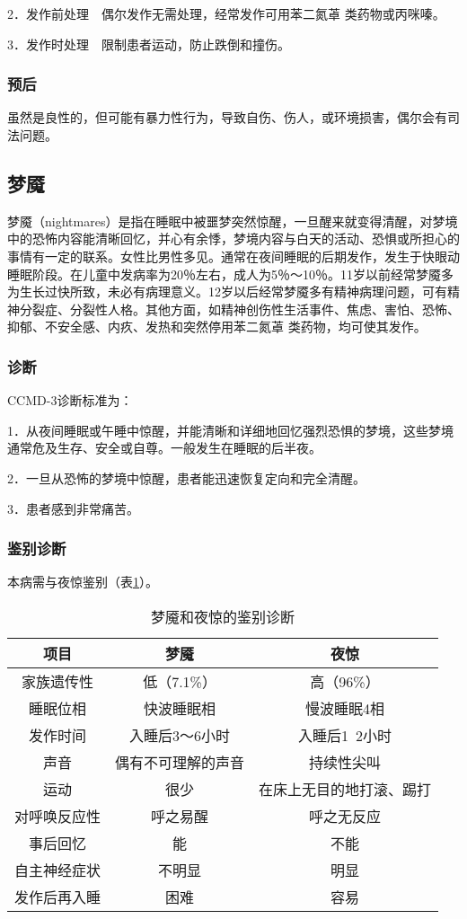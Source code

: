 2．发作前处理　偶尔发作无需处理，经常发作可用苯二氮䓬
类药物或丙咪嗪。

3．发作时处理　限制患者运动，防止跌倒和撞伤。

\subsubsection{预后}

虽然是良性的，但可能有暴力性行为，导致自伤、伤人，或环境损害，偶尔会有司法问题。

\subsection{梦魇}

梦魇（nightmares）是指在睡眠中被噩梦突然惊醒，一旦醒来就变得清醒，对梦境中的恐怖内容能清晰回忆，并心有余悸，梦境内容与白天的活动、恐惧或所担心的事情有一定的联系。女性比男性多见。通常在夜间睡眠的后期发作，发生于快眼动睡眠阶段。在儿童中发病率为20％左右，成人为5％～10％。11岁以前经常梦魇多为生长过快所致，未必有病理意义。12岁以后经常梦魇多有精神病理问题，可有精神分裂症、分裂性人格。其他方面，如精神创伤性生活事件、焦虑、害怕、恐怖、抑郁、不安全感、内疚、发热和突然停用苯二氮䓬
类药物，均可使其发作。

\subsubsection{诊断}

CCMD-3诊断标准为：

1．从夜间睡眠或午睡中惊醒，并能清晰和详细地回忆强烈恐惧的梦境，这些梦境通常危及生存、安全或自尊。一般发生在睡眠的后半夜。

2．一旦从恐怖的梦境中惊醒，患者能迅速恢复定向和完全清醒。

3．患者感到非常痛苦。

\subsubsection{鉴别诊断}

本病需与夜惊鉴别（表\ref{tab13-1}）。

\begin{table}
\centering
\caption{梦魇和夜惊的鉴别诊断}
\label{tab13-1}
\begin{tabular}{ccc}
\toprule
项目 & 梦魇 & 夜惊\\
\midrule
家族遗传性 & 低（7.1\%） & 高（96\%）  \\
睡眠位相 & 快波睡眠相 & 慢波睡眠4相\\
发作时间 & 入睡后3～6小时 & 入睡后1~2小时\\
声音 & 偶有不可理解的声音 & 持续性尖叫\\
运动 & 很少 & 在床上无目的地打滚、踢打 \\
对呼唤反应性 & 呼之易醒 & 呼之无反应 \\
事后回忆 & 能 & 不能 \\
自主神经症状 & 不明显 & 明显 \\
发作后再入睡 & 困难 & 容易 \\
\bottomrule
\end{tabular}
\end{table}

